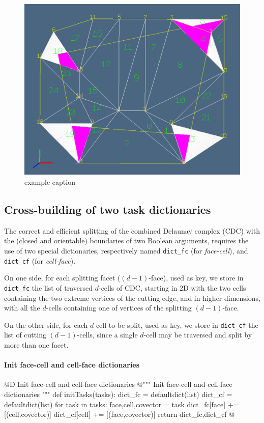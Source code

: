 \documentclass[11pt,oneside]{article}	%
\begin{document}
\begin{figure}[htbp] %
   \centering
   \includegraphics[width=0.6\linewidth]{images/seeds} 
   \caption{example caption}
   \label{fig:example}
\end{figure}


\subsection{Cross-building of two task dictionaries}

The correct and efficient splitting of the combined Delaunay complex (CDC) with the  (closed and orientable) boundaries of two Boolean arguments, requires the use of two special dictionaries, respectively named \texttt{dict\_fc} (for \emph{face-cell}), and \texttt{dict\_cf} (for \emph{cell-face}).
 
On one side, for each splitting facet ($(d-1)$-face), used as key, we store in \texttt{dict\_fc} the list of traversed $d$-cells of CDC, starting in 2D with the two cells containing the two extreme vertices of the cutting edge, and in higher dimensions, with all the $d$-cells containing one of vertices of the splitting $(d-1)$-face.

On the other side, for each $d$-cell to be split, used as key, we store in \texttt{dict\_cf} the list of cutting $(d-1)$-cells, since a single $d$-cell may be traversed and split by more than one facet. 


\paragraph{Init face-cell and cell-face dictionaries}

@D Init face-cell and cell-face dictionaries
@{""" Init face-cell and cell-face dictionaries """
def initTasks(tasks):
	dict_fc = defaultdict(list)
	dict_cf = defaultdict(list)
	for task in tasks:
		face,cell,covector = task
		dict_fc[face] += [(cell,covector)] 
		dict_cf[cell] += [(face,covector)] 
	return dict_fc,dict_cf
@}
\end{document}
